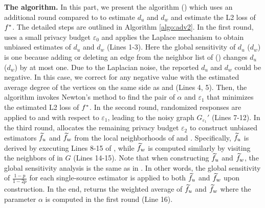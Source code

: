 \noindent
{\bf The \advds algorithm. }
In this part, we present the \advdslong algorithm (\advds) which uses an additional round compared to \advss to estimate $d_u$ and $d_w$ and estimate the L2 loss of $f^*$. 
The detailed steps are outlined in Algorithm \ref{algo:adv2}. 
In the first round, \advds uses a small privacy budget $\varepsilon_0$ and applies the Laplace mechanism to obtain unbiased estimates of $d_u$ and $d_w$ (Lines 1-3). 
{Here the global sensitivity of $d_u$ ($d_w$) is one because adding or deleting an edge from the neighbor list of \vq (\vx) changes $d_u$ ($d_w$) by at most one. }
Due to the Laplacian noise, the reported $d_u$ and $d_w$ could be negative. In this case, we correct for any negative value with the estimated average degree of the vertices on the same side as \vq and \vx (Lines 4, 5). 
Then, the \advds algorithm invokes Newton's method to find the pair of $\alpha$ and $\varepsilon_1$ that minimizes the estimated L2 loss of $f^*$. 
In the second round, randomized responses are applied to \vq and \vx with respect to $\varepsilon_1$, leading to the noisy graph $G_{\varepsilon_1}'$ (Lines 7-12). 
In the third round, \advds allocates the remaining privacy budget $\varepsilon_2$ to construct unbiased estimators $\widetilde{f}_u$ and $\widetilde{f}_w$ from the local neighborhoods of \vq and \vx. Specifically, $\widetilde{f}_u$ is derived by executing Lines 8-15 of \advss, while $\widetilde{f}_w$ is computed similarly by visiting the neighbors of \vx in $G$ (Lines 14-15). 
Note that when constructing $\widetilde{f}_u$ and $\widetilde{f}_w$, the global sensitivity analysis is the same as in \advss. In other words, the global sensitivity of $\frac{1-p}{1-2p}$ for each single-source estimator is applied to both $\widetilde{f}_u$ and $\widetilde{f}_w$ upon construction. 
In the end, \advds returns the weighted average of $\widetilde{f}_u$ and $\widetilde{f}_w$ where the parameter $\alpha$ is computed in the first round (Line 16). 





